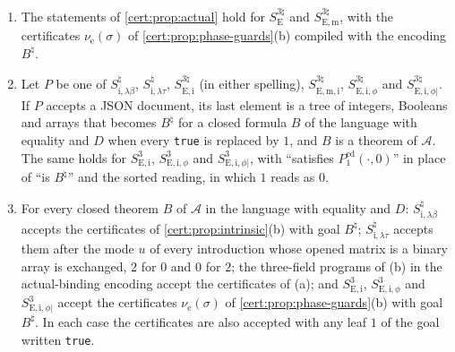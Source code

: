 \begin{proposition}\label{cert:prop:intrinsic-forms}
\begin{enumerate}[label=(\alph*)]
\item The statements of \cref{cert:prop:actual} hold for $S^{3\natural}_{\mathrm E}$ and
$S^{3\natural}_{\mathrm{E,m}}$, with the certificates $\nu_{\mathrm e}(\sigma)$ of
\cref{cert:prop:phase-guards}(b) compiled with the encoding $B^{\natural}$.
\item Let $P$ be one of $S^{\natural}_{\mathrm{i},\lambda\beta}$,
$S^{\natural}_{\mathrm{i},\lambda\tau}$, $S^{3\natural}_{\mathrm{E,i}}$ (in either spelling),
$S^{3\natural}_{\mathrm{E,m,i}}$, $S^{3\natural}_{\mathrm{E,i},\phi}$ and
$S^{3\natural}_{\mathrm{E,i},\phi|}$. If $P$ accepts a JSON document, its last element is a tree
of integers, Booleans and arrays that becomes $B^{\natural}$ for a closed formula $B$ of the
language with equality and $D$ when every \texttt{true} is replaced by $1$, and $B$ is a theorem
of $\mathcal A$. The same holds for $S^{3}_{\mathrm{E,i}}$, $S^{3}_{\mathrm{E,i},\phi}$ and
$S^{3}_{\mathrm{E,i},\phi|}$, with ``satisfies $P^{\mathrm{ed}}_{1}(\cdot,0)$'' in place of ``is
$B^{\natural}$'' and the sorted reading, in which $1$ reads as $0$.
\item For every closed theorem $B$ of $\mathcal A$ in the language with equality and $D$:
$S^{\natural}_{\mathrm{i},\lambda\beta}$ accepts the certificates of \cref{cert:prop:intrinsic}(b)
with goal $B^{\natural}$; $S^{\natural}_{\mathrm{i},\lambda\tau}$ accepts them after the mode $u$
of every introduction whose opened matrix is a binary array is exchanged, $2$ for $0$ and $0$
for $2$; the three-field programs of (b) in the actual-binding encoding accept the certificates
of (a); and $S^{3}_{\mathrm{E,i}}$, $S^{3}_{\mathrm{E,i},\phi}$ and $S^{3}_{\mathrm{E,i},\phi|}$
accept the certificates $\nu_{\mathrm e}(\sigma)$ of \cref{cert:prop:phase-guards}(b) with goal
$B^{\sharp}$. In each case the certificates are also accepted with any leaf $1$ of the goal
written \texttt{true}.
\end{enumerate}
\end{proposition}

